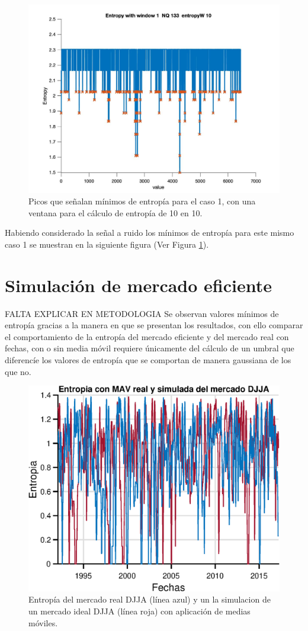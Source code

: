\begin{figure}[h!]
	\centering
	\includegraphics[width=12cm]{figures_matlab/Entropy_window_1_NQ_133_entropyW_10.jpg}
	\caption{Picos que señalan mínimos de entropía para el caso 1, con una ventana para el cálculo de entropía de 10 en 10. }
	\label{caso1entropy_individual}
\end{figure}

Habiendo considerado la señal a ruido los mínimos de entropía para este mismo caso 1 se muestran en la siguiente figura (Ver Figura \ref{caso1entropy_individual}).

\section{Simulación de mercado eficiente}
FALTA EXPLICAR EN METODOLOGIA
Se observan valores mínimos de entropía gracias a la manera en que se presentan los resultados, 
con ello comparar el comportamiento de la entropía del mercado eficiente y del mercado real con fechas, 
con o sin media móvil requiere únicamente del cálculo de un umbral que diferencíe los valores de entropía que se comportan de manera gaussiana  de los que no.


\begin{figure}[h!]
	\centering
	\includegraphics[width=12cm]{figures/MAVentropy}
	\caption{Entropía del mercado real DJJA (línea azul) y un la simulacion de un mercado ideal DJJA (línea roja) con aplicación de medias móviles.}
	\label{fig:maventropy}
\end{figure}

